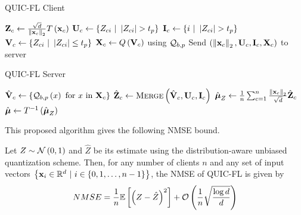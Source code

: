 \documentclass[journal,12pt,twocolumn]{IEEEtran}
\begin{document}
\begin{algorithm}[H]
    \caption{QUIC-FL Client}
    \label{alg:quic-fl-client}
    \begin{algorithmic}[1]
        \State $\boldsymbol{\mathbf{Z}}_c \gets \frac{\sqrt{d}}{\left\lVert\boldsymbol{\mathbf{x}}_c\right\rVert_2}T\left(\boldsymbol{\mathbf{x}}_c\right)$
        \State $\boldsymbol{\mathbf{U}}_c \gets \left\{Z_{ci}\ |\ \left\vert Z_{ci}\right\vert > t_p\right\}$
        \State $\vect{I}_c \gets \cbrak{i\ |\ \abs{Z_{ci}} > t_p}$
        \State $\boldsymbol{\mathbf{V}}_c \gets \left\{Z_{ci}\ |\ \left\vert Z_{ci}\right\vert \le t_p\right\}$
        \State $\boldsymbol{\mathbf{X}}_c \gets Q\left(\boldsymbol{\mathbf{V}}_c\right)$ using $\mathcal Q_{b,p}$
        \State Send $\left(\left\lVert\boldsymbol{\mathbf{x}}_c\right\rVert_2, \boldsymbol{\mathbf{U}}_c, \boldsymbol{\mathbf{I}}_c, \boldsymbol{\mathbf{X}}_c\right)$ to server
        \EndProcedure
    \end{algorithmic}
\end{algorithm}

\begin{algorithm}[H]
    \caption{QUIC-FL Server}
    \label{alg:quic-fl-server}
    \begin{algorithmic}[1]
            \State $\hat{\boldsymbol{\mathbf{V}}}_c \gets \left\{\mathcal Q_{b,p}\left(x\right) \text{ for } x \text{ in } \boldsymbol{\mathbf{X}}_c\right\}$
            \State $\hat{\boldsymbol{\mathbf{Z}}}_c \gets \textsc{Merge}\left(\hat{\boldsymbol{\mathbf{V}}}_c, \boldsymbol{\mathbf{U}}_c, \boldsymbol{\mathbf{I}}_c\right)$
        \EndFor
        \State $\hat{\boldsymbol{\mathbf{\mu}}}_Z \gets \frac{1}{n}\sum_{c=1}^{n}\frac{\left\lVert\boldsymbol{\mathbf{x}}_c\right\rVert_2}{\sqrt{d}}\hat{\boldsymbol{\mathbf{Z}}}_c$
        \State $\hat{\boldsymbol{\mathbf{\mu}}} \gets T^{-1}\left(\hat{\boldsymbol{\mathbf{\mu}}}_Z\right)$
        \EndProcedure
    \end{algorithmic}
\end{algorithm}

This proposed algorithm gives the following NMSE bound.

\begin{theorem}
    Let \(Z\sim\mathcal N\left(0,1\right)\) and \(\hat{Z}\) be its estimate using the
    distribution-aware unbiased quantization scheme. Then, for any number of
    clients \(n\) and any set of input vectors \(\left\{\boldsymbol{\mathbf{x}}_i \in\mathbb R^d\ |\
    i\in\left\{0,1,\ldots,n-1\right\}\right\}\), the NMSE of QUIC-FL is given by
    \begin{equation}
        NMSE = \frac{1}{n}\mathbb{E}\left[ \left(Z-\hat{Z}\right)^2 \right] + \mathcal O\left(\frac{1}{n}\sqrt{\frac{\log d}{d}}\right)
        \label{eq:quic-fl-nmse}
    \end{equation}
\end{theorem}
\end{document}
